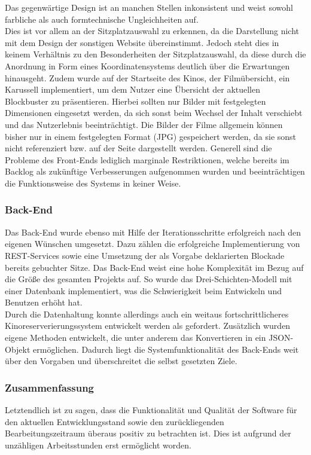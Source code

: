 Das gegenwärtige Design ist an manchen Stellen inkonsistent und weist sowohl farbliche als auch formtechnische Ungleichheiten auf. \\
Dies ist vor allem an der Sitzplatzauswahl zu erkennen, da die Darstellung nicht mit dem Design der sonstigen Website übereinstimmt.
Jedoch steht dies in keinem Verhältnis zu den Besonderheiten der Sitzplatzauswahl, da diese durch die Anordnung in Form eines Koordinatensystems deutlich über die Erwartungen hinausgeht.
Zudem wurde auf der Startseite des Kinos, der Filmübersicht, ein Karussell implementiert, um dem Nutzer eine Übersicht der aktuellen Blockbuster zu präsentieren.
Hierbei sollten nur Bilder mit festgelegten Dimensionen eingesetzt werden, da sich sonst beim Wechsel der Inhalt verschiebt und das Nutzerlebnis beeinträchtigt.
Die Bilder der Filme allgemein können bisher nur in einem festgelegten Format (JPG) gespeichert werden, da sie sonst nicht referenziert bzw. auf der Seite dargestellt werden.
Generell sind die Probleme des Front-Ends lediglich marginale Restriktionen, welche bereits im Backlog als zukünftige Verbesserungen aufgenommen wurden und beeinträchtigen die Funktionsweise des Systems in keiner Weise.

\subsubsection*{Back-End}
Das Back-End wurde ebenso mit Hilfe der Iterationsschritte erfolgreich nach den eigenen Wünschen umgesetzt.
Dazu zählen die erfolgreiche Implementierung von \acs{REST}-Services sowie eine Umsetzung der als Vorgabe deklarierten Blockade bereits gebuchter Sitze.
Das Back-End weist eine hohe Komplexität im Bezug auf die Größe des gesamten Projekts auf.
So wurde das Drei-Schichten-Modell mit einer Datenbank implementiert, was die Schwierigkeit beim Entwickeln und Benutzen erhöht hat.\\
Durch die Datenhaltung konnte allerdings auch ein weitaus fortschrittlicheres Kinoreserverierungssystem entwickelt werden als gefordert.
Zusätzlich wurden eigene Methoden entwickelt, die unter anderem das Konvertieren in ein \acs{JSON}-Objekt ermöglichen. Dadurch liegt die Systemfunktionalität des Back-Ends weit über den Vorgaben und überschreitet die selbst gesetzten Ziele.

\subsubsection*{Zusammenfassung}
Letztendlich ist zu sagen, dass die Funktionalität und Qualität der Software für den aktuellen Entwicklungsstand sowie den zurückliegenden Bearbeitungszeitraum überaus positiv zu betrachten ist.
Dies ist aufgrund der unzähligen Arbeitsstunden erst ermöglicht worden.

